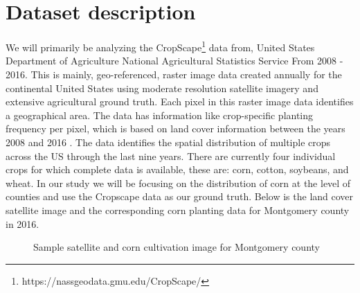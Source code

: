 \documentclass[10pt,letterpaper]{article}
\begin{document}
\section{Dataset description}
We will primarily be analyzing the CropScape\footnote{https://nassgeodata.gmu.edu/CropScape/} data from, United States Department of Agriculture
National Agricultural Statistics Service From 2008 - 2016. This is mainly, geo-referenced, raster image data created annually for the continental United States using moderate resolution satellite imagery and extensive agricultural ground truth. Each pixel in this raster image data identifies a geographical area. The data has information like crop-specific planting frequency per pixel, which is based on land cover information between the years 2008 and 2016 . The data identifies the spatial distribution of multiple crops across the US through the last nine years. There are currently four individual crops for which complete data is available, these are: corn, cotton, soybeans, and wheat. In our study we will be focusing on the distribution of corn at the level of counties and use the Cropscape data as our ground truth. Below is the land cover satellite image and the corresponding corn planting data for Montgomery county in 2016. 

\begin{figure}[ht]
\hfill
{}
\hfill
{}
\hfill \hfill
\caption{Sample satellite and corn cultivation image for Montgomery county}
\end{figure}
\end{document}
